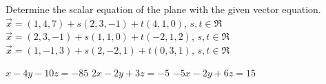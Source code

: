 
\begin{Exercise}[
name={},
title={}, 
difficulty=0,
origin={\cite{SM}}]
Determine the scalar equation of the plane with the given vector equation.
\Question $\vec{x} = (1,4,7) + s(2,3,-1) + t(4,1,0)$, $s,t\in\Re$
\Question $\vec{x} = (2,3,-1) + s(1,1,0) + t(-2,1,2)$, $s,t\in\Re$
\Question $\vec{x} = (1,-1,3) + s(2,-2,1) + t(0,3,1)$, $s,t\in\Re$
\end{Exercise}

\begin{Answer}
\Question $x-4y-10z=-85$
\Question $2x-2y+3z=-5$
\Question $-5x-2y+6z=15$
\end{Answer}
